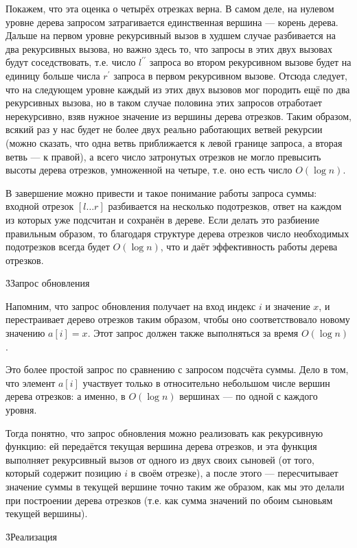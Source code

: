 Покажем, что эта оценка о четырёх отрезках верна. В самом деле, на нулевом уровне дерева запросом затрагивается единственная вершина --- корень дерева. Дальше на первом уровне рекурсивный вызов в худшем случае разбивается на два рекурсивных вызова, но важно здесь то, что запросы в этих двух вызовах будут соседствовать, т.е. число $l^{\prime\prime}$ запроса во втором рекурсивном вызове будет на единицу больше числа $r^\prime$ запроса в первом рекурсивном вызове. Отсюда следует, что на следующем уровне каждый из этих двух вызовов мог породить ещё по два рекурсивных вызова, но в таком случае половина этих запросов отработает нерекурсивно, взяв нужное значение из вершины дерева отрезков. Таким образом, всякий раз у нас будет не более двух реально работающих ветвей рекурсии (можно сказать, что одна ветвь приближается к левой границе запроса, а вторая ветвь --- к правой), а всего число затронутых отрезков не могло превысить высоты дерева отрезков, умноженной на четыре, т.е. оно есть число $O (\log n)$.

В завершение можно привести и такое понимание работы запроса суммы: входной отрезок $[l \ldots r]$ разбивается на несколько подотрезков, ответ на каждом из которых уже подсчитан и сохранён в дереве. Если делать это разбиение правильным образом, то благодаря структуре дерева отрезков число необходимых подотрезков всегда будет $O (\log n)$, что и даёт эффективность работы дерева отрезков.


\h3{Запрос обновления}

Напомним, что запрос обновления получает на вход индекс $i$ и значение $x$, и перестраивает дерево отрезков таким образом, чтобы оно соответствовало новому значению $a[i]=x$. Этот запрос должен также выполняться за время $O (\log n)$.

Это более простой запрос по сравнению с запросом подсчёта суммы. Дело в том, что элемент $a[i]$ участвует только в относительно небольшом числе вершин дерева отрезков: а именно, в $O (\log n)$ вершинах --- по одной с каждого уровня.

Тогда понятно, что запрос обновления можно реализовать как рекурсивную функцию: ей передаётся текущая вершина дерева отрезков, и эта функция выполняет рекурсивный вызов от одного из двух своих сыновей (от того, который содержит позицию $i$ в своём отрезке), а после этого --- пересчитывает значение суммы в текущей вершине точно таким же образом, как мы это делали при построении дерева отрезков (т.е. как сумма значений по обоим сыновьям текущей вершины).


\h3{Реализация}

